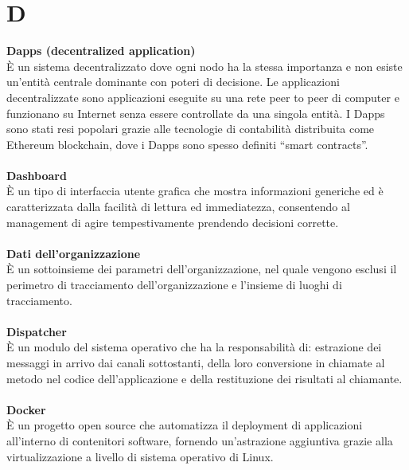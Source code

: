 \section{D}
\textbf{Dapps (decentralized application)}\\
È un sistema decentralizzato dove ogni nodo ha la stessa importanza e non esiste un'entità centrale dominante con poteri di decisione. Le applicazioni decentralizzate sono applicazioni eseguite su una rete peer to peer di computer e funzionano su Internet senza essere controllate da una singola entità. I Dapps sono stati resi popolari grazie alle tecnologie di contabilità distribuita come Ethereum blockchain, dove i Dapps sono spesso definiti “smart contracts”. \\ \\
\textbf{Dashboard}\\
È un tipo di interfaccia utente grafica che mostra informazioni generiche ed è caratterizzata dalla facilità di lettura ed immediatezza, consentendo al management di agire tempestivamente prendendo decisioni corrette. \\ \\
\textbf{Dati dell'organizzazione}\\
È un sottoinsieme dei parametri dell'organizzazione, nel quale vengono esclusi il perimetro di tracciamento dell'organizzazione e l'insieme di luoghi di tracciamento. \\ \\
\textbf{Dispatcher}\\
È un modulo del sistema operativo che ha la responsabilità di: estrazione dei messaggi in arrivo dai canali sottostanti, della loro conversione in chiamate al metodo nel codice dell'applicazione e della restituzione dei risultati al chiamante. \\ \\
\textbf{Docker}\\
È un progetto open source che automatizza il deployment di applicazioni all'interno di contenitori software, fornendo un'astrazione aggiuntiva grazie alla virtualizzazione a livello di sistema operativo di Linux. \\ \\
\clearpage